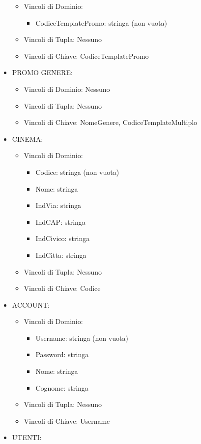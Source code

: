 \documentclass[a4paper,12pt]{report}
\begin{document}
\begin{itemize}
\begin{itemize}
		\item Vincoli di Dominio:
		\begin{itemize}
			\item CodiceTemplatePromo: stringa (non vuota)
		\end{itemize}
		\item Vincoli di Tupla: Nessuno
		\item Vincoli di Chiave: CodiceTemplatePromo
	\end{itemize}
	\item PROMO GENERE:
	\begin{itemize}
		\item Vincoli di Dominio: Nessuno
		\item Vincoli di Tupla: Nessuno
		\item Vincoli di Chiave: NomeGenere, CodiceTemplateMultiplo
	\end{itemize}
	\item CINEMA:
	\begin{itemize}
		\item Vincoli di Dominio:
		\begin{itemize}
			\item Codice: stringa (non vuota)
			\item Nome: stringa
			\item IndVia: stringa
			\item IndCAP: stringa
			\item IndCivico: stringa
			\item IndCitta: stringa
		\end{itemize}
		\item Vincoli di Tupla: Nessuno
		\item Vincoli di Chiave: Codice
	\end{itemize}
	\item ACCOUNT:
	\begin{itemize}
		\item Vincoli di Dominio:
		\begin{itemize}
			\item Username: stringa (non vuota)
			\item Password: stringa
			\item Nome: stringa
			\item Cognome: stringa
		\end{itemize}
		\item Vincoli di Tupla: Nessuno
		\item Vincoli di Chiave: Username
	\end{itemize}
	\item UTENTI:

\end{itemize}
\end{document}

